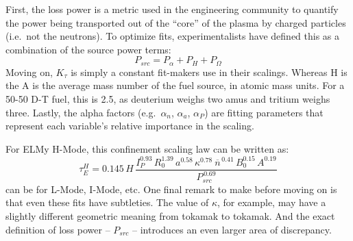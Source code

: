 First, the loss power is a metric used in the engineering community to quantify the power being transported out of the ``core'' of the plasma by charged particles (i.e.\ not the neutrons). \cite{process} To optimize fits, experimentalists have defined this as a combination of the source power terms:
\begin{equation}
	\label{eq:pl}
	P_{src} = P_\alpha + P_H + P_\Omega
\end{equation}
Moving on, $K_\tau$ is simply a constant fit-makers use in their scalings. Whereas H is the   A is the average mass number of the fuel source, in atomic mass units. For a 50-50 D-T fuel, this is 2.5, as deuterium weighs two amus and tritium weighs three. Lastly, the alpha factors (e.g.\ $\alpha_n$, $\alpha_a$, $\alpha_P$) are fitting parameters that represent each variable's relative importance in the scaling.

For ELMy H-Mode, this confinement scaling law can be written as:
\begin{equation}
	\tau_E^H = 0.145 \, H \, \frac{
		I_P^{0.93} \, R_0^{1.39} \, a^{0.58} \, \kappa^{0.78} \ \overline{n}^{\, 0.41} \, B_0^{0.15} \, A^{0.19}
	}{ P_{src} ^ {\,0.69} }
	\label{eq:tau_h}
\end{equation}
 can be  for L-Mode, I-Mode, etc. One final remark to make before moving on is that even these fits have subtleties. The value of $\kappa$, for example, may have a slightly different geometric meaning from tokamak to tokamak. And the exact definition of loss power -- $P_{src}$ -- introduces an even larger area of discrepancy.  

